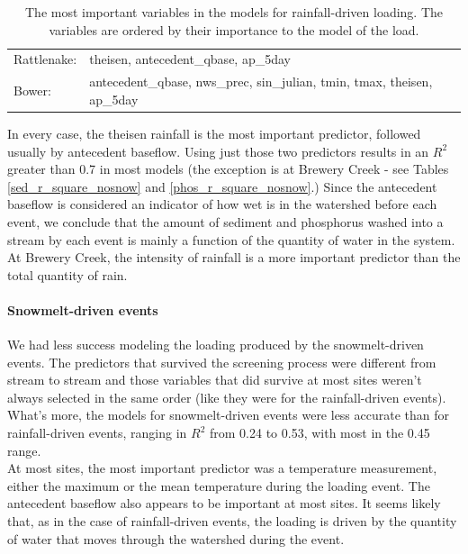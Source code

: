 \documentclass[10pt]{article}
\begin{document}
\begin{table}[h!]
\begin{center}
\begin{tabular}{ll}
        \hspace{5mm} Rattlenake: & theisen, antecedent\_qbase, ap\_5day\\
        \hspace{5mm} Bower: & antecedent\_qbase, nws\_prec, sin\_julian, tmin, tmax, theisen, ap\_5day\\
    \end{tabular}
    \caption{The most important variables in the models for rainfall-driven loading. The variables are ordered by their importance to the model of the load. \label{nosnow_predictor_list}}
    \end{center}
\end{table}

In every case, the theisen rainfall is the most important predictor, followed usually by antecedent baseflow. Using just those two predictors results in an $R^2$ greater than 0.7 in most models (the exception is at Brewery Creek - see Tables \ref{sed_r_square_nosnow} and \ref{phos_r_square_nosnow}.) Since the antecedent baseflow is considered an indicator of how wet is in the watershed before each event, we conclude that the amount of sediment and phosphorus washed into a stream by each event is mainly a function of the quantity of water in the system. At Brewery Creek, the intensity of rainfall is a more important predictor than the total quantity of rain.\\

\paragraph{Snowmelt-driven events} We had less success modeling the loading produced by the snowmelt-driven events. The predictors that survived the screening process were different from stream to stream and those variables that did survive at most sites weren't always selected in the same order (like they were for the rainfall-driven events). What's more, the models for snowmelt-driven events were less accurate than for rainfall-driven events, ranging in $R^2$ from 0.24 to 0.53, with most in the 0.45 range.\\

At most sites, the most important predictor was a temperature measurement, either the maximum or the mean temperature during the loading event. The antecedent baseflow also appears to be important at most sites. It seems likely that, as in the case of rainfall-driven events, the loading is driven by the quantity of water that moves through the watershed during the event.
\end{document}
